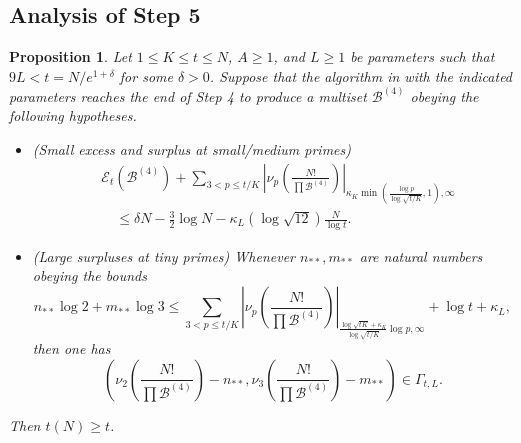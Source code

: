 \documentclass[12pt,a4paper,reqno]{amsart}
\numberwithin{equation}{section}
\theoremstyle{plain}
\newtheorem{proposition}[theorem]{Proposition}
\theoremstyle{definition}
\newcommand\tuple{{\mathcal B}}
\newcommand\excess{{\mathcal{E}}}
\begin{document}
\subsection{Analysis of Step 5}

\begin{proposition}\label{balance-23'}  Let $1 \leq K \leq t \leq N$, $A \geq 1$, and $L \geq 1$ be parameters such that $9L < t = N/e^{1+\delta}$ for some $\delta>0$.  Suppose that the algorithm in  with the indicated parameters reaches the end of Step 4 to produce a multiset $\tuple^{(4)}$ obeying the following hypotheses.
\begin{itemize}
\item[(i)] (Small excess and surplus at small/medium primes)
\begin{equation}\label{new-balance-4}
  \begin{split}
&      \excess_t(\tuple^{(4)}) + \sum_{3 < p \leq t/K}
 \left|\nu_p\left(\frac{N!}{\prod \tuple^{(4)}}\right)\right|_{\kappa_K \min(\frac{\log p}{\log \sqrt{t/K}},1),\infty} \\
&\quad    \leq \delta N - \frac{3}{2} \log N - \kappa_L (\log \sqrt{12}) \frac{N}{\log t}.
  \end{split}
 \end{equation}
 \item[(ii)] (Large surpluses at tiny primes) Whenever $n_{**}, m_{**}$ are natural numbers obeying the  bounds
 $$ n_{**} \log 2 + m_{**} \log 3 \leq 
 \sum_{3 < p \leq t/K}
 \left|\nu_p\left(\frac{N!}{\prod \tuple^{(4)}}\right)\right|_{\frac{\log \sqrt{tK} + \kappa_K}{\log\sqrt{t/K}} \log p,\infty}
 + \log t + \kappa_L,$$
 then one has
 $$\left( \nu_2\left(\frac{N!}{\prod \tuple^{(4)}}\right) - n_{**}, \nu_3\left(\frac{N!}{\prod \tuple^{(4)}}\right) - m_{**}\right) \in \Gamma_{t,L}.$$
 \end{itemize}
  Then $t(N) \geq t$.
\end{proposition}
\end{document}

